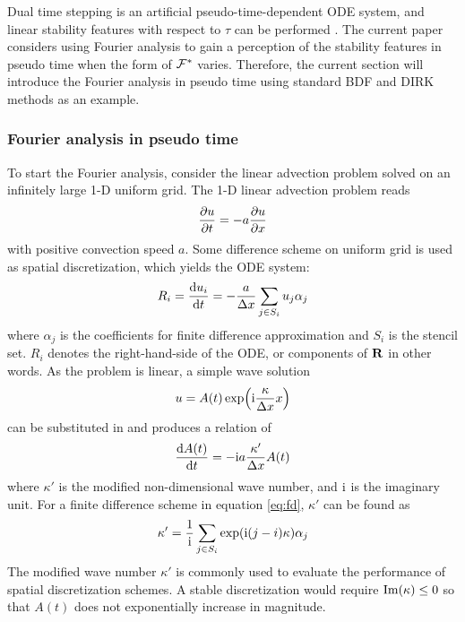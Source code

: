 Dual time stepping  is an artificial
pseudo-time-dependent ODE system, and linear stability features with
respect to $\tau$ can be performed \cite{jameson1991time}.
The current paper considers using Fourier analysis
to gain a perception of the stability features in pseudo time
when the form of $\mathcal{F}^*$ varies.
Therefore, the current section will introduce the
Fourier analysis in pseudo time using standard BDF and DIRK
methods as an example.


\subsubsection{Fourier analysis in pseudo time}
\label{sssec:fourier}



To start the Fourier analysis, consider the linear advection problem
solved on an infinitely large 1-D uniform
grid.
The 1-D linear advection problem reads
\begin{equation}
    \partialderivative{u}{t} = -a \partialderivative{u}{x}
\end{equation}
with positive convection speed $a$.
Some difference scheme on uniform grid is used as spatial  discretization, which
yields the ODE system:
\begin{equation}
    R_i=\derivative{u_i}{t} = -\frac{a}{\inc x} \sum_{j\in S_i}u_j\alpha_j
    \label{eq:fd}
\end{equation}
where $\alpha_j$ is the coefficients for finite difference approximation
and $S_i$ is the stencil set. $R_i$ denotes the right-hand-side of the ODE,
or components of $\mathbf{R}$ in other words.
As the problem is linear,
a simple wave solution
\begin{equation}
    u = A(t)\exp(\mathrm{i} \frac{\kappa}{{\Delta} x} x)
\end{equation}
can be substituted in and produces
a relation of
\begin{equation}
    \frac{\dd A(t)}{\dd t} = -\mathrm{i} a\frac{\kappa'}{{\Delta} x}  A(t)
\end{equation}
where $\kappa'$ is the modified non-dimensional wave number,
and $\mathrm{i}$ is the imaginary unit.
For a finite difference scheme in equation \eqref{eq:fd},
$\kappa'$ can be found as
\begin{equation}
    \kappa' = \frac{1}{\mathrm{i}} \sum_{j\in S_i}\exp(\mathrm{i} (j-i)\kappa)\alpha_j
\end{equation}
The modified wave number $\kappa'$ is commonly used to evaluate the performance of
spatial  discretization schemes.
A stable discretization would require $\mathrm{Im}(\kappa) \leq 0$ so that
$A(t)$ does not exponentially increase in magnitude.

